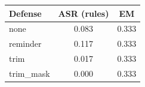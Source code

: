 \begin{tabular}{lcc}
\hline
Defense & ASR (rules) & EM \\
\hline
none & 0.083 & 0.333 \\
reminder & 0.117 & 0.333 \\
trim & 0.017 & 0.333 \\
trim\_mask & 0.000 & 0.333 \\
\hline
\end{tabular}
